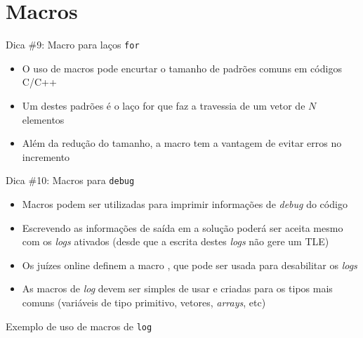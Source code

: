 \section{Macros}

\begin{frame}[fragile]{Dica \#9: Macro para laços \texttt{for}}

    \begin{itemize}
        \item O uso de macros pode encurtar o tamanho de padrões comuns em códigos C/C++

        \item Um destes padrões é o laço for que faz a travessia de um vetor de $N$ elementos

        \item Além da redução do tamanho, a macro tem a vantagem de evitar erros no incremento

    \end{itemize}

\end{frame}

\begin{frame}[fragile]{Dica \#10: Macros para \texttt{debug}}

    \begin{itemize}
        \item Macros podem ser utilizadas para imprimir informações de \textit{debug} do código

        \item Escrevendo as informações de saída em  a solução poderá ser
            aceita mesmo com os \textit{logs} ativados (desde que a escrita destes \textit{logs}
            não gere um TLE)

        \item Os juízes online definem a macro , que pode ser usada para
            desabilitar os \textit{logs}

        \item As macros de \textit{log} devem ser simples de usar e criadas para os tipos mais
            comuns (variáveis de tipo primitivo, vetores, \textit{arrays}, etc)
    \end{itemize}

\end{frame}

\begin{frame}[fragile]{Exemplo de uso de macros de \texttt{log}}
\end{frame}
